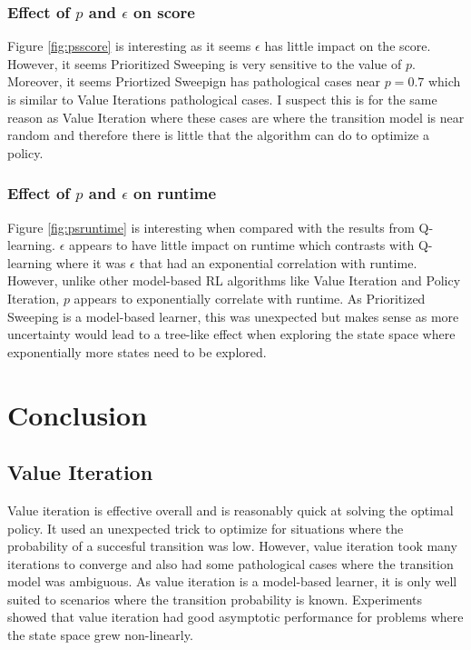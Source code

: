\documentclass[11pt]{article}
\begin{document}


\subsubsection{Effect of $p$ and $\epsilon$ on score}
Figure \ref{fig:psscore} is interesting as it seems $\epsilon$ has little impact on the score. However, it seems Prioritized Sweeping is very sensitive to the value of $p$. Moreover, it seems Priortized Sweepign has pathological cases near $p=0.7$ which is similar to Value Iterations pathological cases. I suspect this is for the same reason as Value Iteration where these cases are where the transition model is near random and therefore there is little that the algorithm can do to optimize a policy.

\subsubsection{Effect of $p$ and $\epsilon$ on runtime}
Figure \ref{fig:psruntime} is interesting when compared with the results from Q-learning. $\epsilon$ appears to have little impact on runtime which contrasts with Q-learning where it was $\epsilon$ that had an exponential correlation with runtime. However, unlike other model-based RL algorithms like Value Iteration and Policy Iteration, $p$ appears to exponentially correlate with runtime. As Prioritized Sweeping is a model-based learner, this was unexpected but makes sense as more uncertainty would lead to a tree-like effect when exploring the state space where exponentially more states need to be explored.



\section{Conclusion}
\subsection{Value Iteration}
Value iteration is effective overall and is reasonably quick at solving the optimal policy. It used an unexpected trick to optimize for situations where the probability of a succesful transition was low. However, value iteration took many iterations to converge and also had some pathological cases where the transition model was ambiguous. As value iteration is a model-based learner, it is only well suited to scenarios where the transition probability is known. Experiments showed that value iteration had good asymptotic performance for problems where the state space grew non-linearly.
\end{document}
